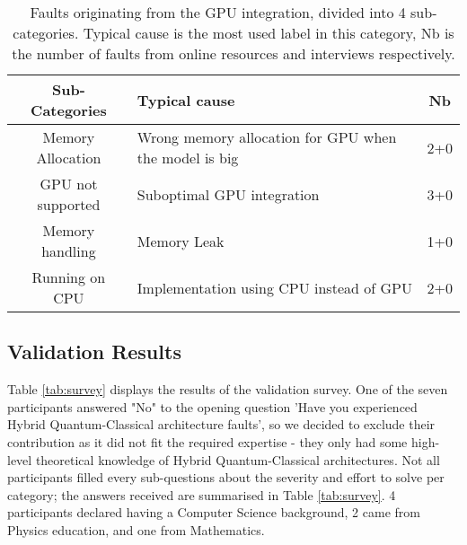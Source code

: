 \begin{table}[hbt!]
    \centering
        \caption{Faults originating from the GPU integration, divided into 4 sub-categories. Typical cause is the most used label in this category, Nb is the number of faults from online resources and interviews respectively.}
    \label{tab:gpu}
    \begin{tabular}{@{}c|l|c}
       \textbf{ Sub-Categories} & \textbf{Typical cause} & \textbf{Nb} \\
         \hline
      Memory Allocation  & Wrong memory allocation for GPU when the model is big &  2+0 \\
         \hline
       GPU not supported & Suboptimal GPU integration  &  3+0 \\
         \hline
        Memory handling & Memory Leak & 1+0 \\
          \hline
        Running on CPU & Implementation using CPU instead of GPU  & 2+0 \\
    \end{tabular}
\end{table}



\subsection{Validation Results}
Table \ref{tab:survey} displays the results of the validation survey. One of the seven participants answered "No" to the opening question 'Have you experienced Hybrid Quantum-Classical architecture faults', so we decided to exclude their contribution as it did not fit the required expertise - they only had some high-level theoretical knowledge of Hybrid Quantum-Classical architectures.  Not all participants filled every sub-questions about the severity and effort to solve per category; the answers received are summarised in Table \ref{tab:survey}. 4 participants declared having a Computer Science background, 2 came from Physics education, and one from Mathematics.

